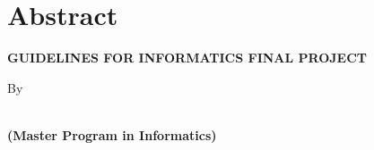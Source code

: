 \clearpage
\chapter*{Abstract}
\begin{center}
	\singlespacing
    \large \bfseries \MakeUppercase{Guidelines for Informatics Final Project} %

    \normalsize \normalfont By

    \bfseries \large \theauthor\\
    \normalsize (Master Program in Informatics)
    \bigskip
\end{center}

\begin{singlespace}

\blindtext

\end{singlespace}
\clearpage